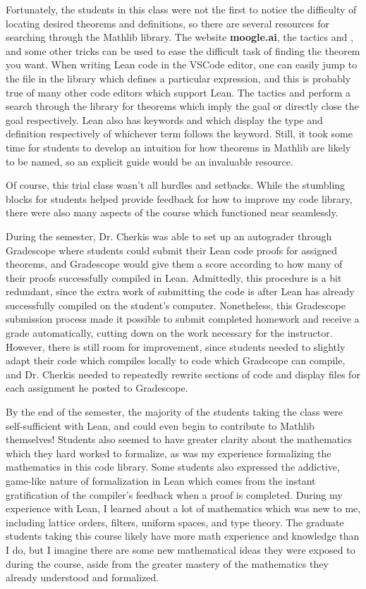 Fortunately, the students in this class were not the first to notice the 
difficulty of locating desired theorems and definitions, 
so there are several resources for searching through the Mathlib library. 
The website \textbf{moogle.ai}, the tactics  and , 
and some other tricks can be used to ease the difficult task of finding the 
theorem you want. When writing Lean code in the VSCode editor, one can 
easily jump to the file in the library which defines a particular expression,
and this is probably true of many other code editors which support Lean. The 
tactics  and  perform a search through the library
for theorems which imply the goal or directly close the goal respectively. 
Lean also has keywords  and  which display
the type and definition respectively of whichever term follows the keyword.
Still, it took some time for students to develop an intuition for how
theorems in Mathlib are likely to be named, so an explicit guide would 
be an invaluable resource. 

Of course, this trial class wasn't all hurdles and setbacks. While the
stumbling blocks for students helped provide feedback for how to improve
my code library, there were also many aspects of the course which functioned
near seamlessly.

During the semester, Dr. Cherkis was able to set up an autograder 
through Gradescope where students could submit their Lean code proofs
for assigned theorems, and Gradescope would give them a score according to 
how many of their proofs successfully compiled in Lean. Admittedly, this 
procedure is a bit redundant, since the extra work of submitting the code
is after Lean has already successfully compiled on the student's computer.
Nonetheless, this Gradescope submission process made it possible to 
submit completed homework and receive a grade automatically, cutting down on
the work necessary for the instructor. However, there is still room for
improvement, since students needed to slightly adapt their code which compiles
locally to code which Gradscope can compile, and Dr. Cherkis needed to 
repeatedly rewrite sections of code and display files for each assignment he 
posted to Gradescope. 

By the end of the semester, the majority of the students taking the
class were self-sufficient with Lean, and could even begin to contribute
to Mathlib themselves! Students also seemed to have greater clarity 
about the mathematics which they hard worked to formalize, as was my 
experience formalizing the mathematics in this code library. 
Some students also expressed the addictive, game-like nature of formalization
in Lean which comes from the instant gratification of the compiler's feedback
when a proof is completed. During my experience with Lean, I learned about a 
lot of mathematics which was new to me, including lattice orders, filters, 
uniform spaces, and type theory. The graduate students taking this course
likely have more math experience and knowledge than I do, but I imagine 
there are some new mathematical ideas they were exposed to during the course,
aside from the greater mastery of the mathematics they already understood and
formalized.

